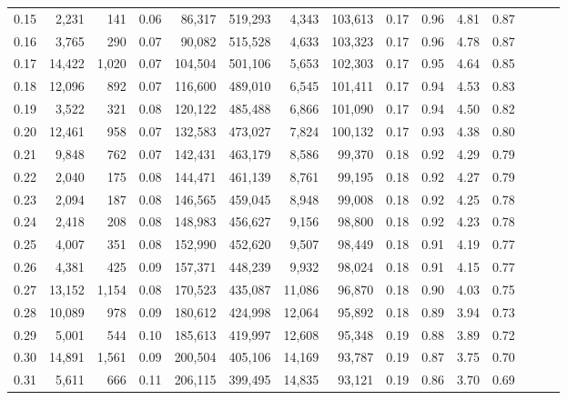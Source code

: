 \begin{tabular}{rrrrrrrrrrrrrrr}
0.15 &   2,231 &    141 &  0.06 &   86,317 &  519,293 &    4,343 &  103,613 &  0.17 &  0.96 &  4.81 &      0.87 \\
0.16 &   3,765 &    290 &  0.07 &   90,082 &  515,528 &    4,633 &  103,323 &  0.17 &  0.96 &  4.78 &      0.87 \\
0.17 &  14,422 &  1,020 &  0.07 &  104,504 &  501,106 &    5,653 &  102,303 &  0.17 &  0.95 &  4.64 &      0.85 \\
0.18 &  12,096 &    892 &  0.07 &  116,600 &  489,010 &    6,545 &  101,411 &  0.17 &  0.94 &  4.53 &      0.83 \\
0.19 &   3,522 &    321 &  0.08 &  120,122 &  485,488 &    6,866 &  101,090 &  0.17 &  0.94 &  4.50 &      0.82 \\
0.20 &  12,461 &    958 &  0.07 &  132,583 &  473,027 &    7,824 &  100,132 &  0.17 &  0.93 &  4.38 &      0.80 \\
0.21 &   9,848 &    762 &  0.07 &  142,431 &  463,179 &    8,586 &   99,370 &  0.18 &  0.92 &  4.29 &      0.79 \\
0.22 &   2,040 &    175 &  0.08 &  144,471 &  461,139 &    8,761 &   99,195 &  0.18 &  0.92 &  4.27 &      0.79 \\
0.23 &   2,094 &    187 &  0.08 &  146,565 &  459,045 &    8,948 &   99,008 &  0.18 &  0.92 &  4.25 &      0.78 \\
0.24 &   2,418 &    208 &  0.08 &  148,983 &  456,627 &    9,156 &   98,800 &  0.18 &  0.92 &  4.23 &      0.78 \\
0.25 &   4,007 &    351 &  0.08 &  152,990 &  452,620 &    9,507 &   98,449 &  0.18 &  0.91 &  4.19 &      0.77 \\
0.26 &   4,381 &    425 &  0.09 &  157,371 &  448,239 &    9,932 &   98,024 &  0.18 &  0.91 &  4.15 &      0.77 \\
0.27 &  13,152 &  1,154 &  0.08 &  170,523 &  435,087 &   11,086 &   96,870 &  0.18 &  0.90 &  4.03 &      0.75 \\
0.28 &  10,089 &    978 &  0.09 &  180,612 &  424,998 &   12,064 &   95,892 &  0.18 &  0.89 &  3.94 &      0.73 \\
0.29 &   5,001 &    544 &  0.10 &  185,613 &  419,997 &   12,608 &   95,348 &  0.19 &  0.88 &  3.89 &      0.72 \\
0.30 &  14,891 &  1,561 &  0.09 &  200,504 &  405,106 &   14,169 &   93,787 &  0.19 &  0.87 &  3.75 &      0.70 \\
0.31 &   5,611 &    666 &  0.11 &  206,115 &  399,495 &   14,835 &   93,121 &  0.19 &  0.86 &  3.70 &      0.69 \\

\end{tabular}
